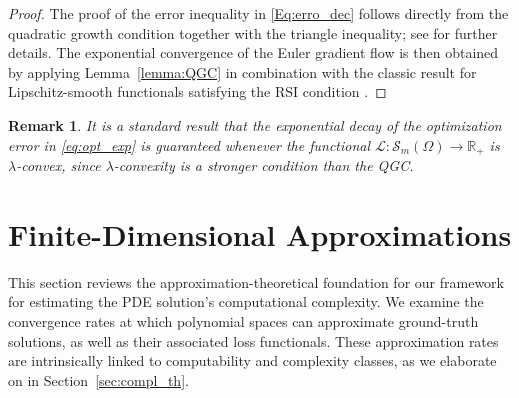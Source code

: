 \documentclass[pdflatex]{sn-jnl}%
\newtheorem{remark}[theorem]{Remark}
\begin{document}
\vspace{-1em}\begin{proof}
The proof of the error inequality in \eqref{Eq:erro_dec} follows directly from the quadratic growth condition together with the triangle inequality; see \cite{Suarez2025} for further details. The exponential convergence of the Euler gradient flow is then obtained by applying Lemma~\ref{lemma:QGC} in combination with the classic result for Lipschitz-smooth functionals satisfying the RSI condition \cite{Karimi2016-zl}.
\end{proof}
\begin{remark}\label{rk:lam_conv}
It is a standard result \cite{Karimi2016-zl} that the exponential decay of the optimization error in \eqref{eq:opt_exp} is guaranteed whenever the functional $\mathcal{L}:\mathcal{S}_m(\Omega)\to\mathbb{R}_+$ is $\lambda$-convex, since $\lambda$-convexity is a stronger condition than the QGC. 
\end{remark}
\section{Finite-Dimensional Approximations}
This section reviews the approximation-theoretical foundation for our framework for estimating the PDE solution's computational complexity. We examine the convergence rates at which polynomial spaces can approximate ground-truth solutions, as well as their associated loss functionals. These approximation rates are intrinsically linked to computability and complexity classes, as we elaborate on in Section~\ref{sec:compl_th}.
\end{document}
